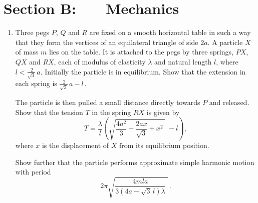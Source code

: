 \documentclass[a4, 11pt]{report}
\newlength{\qspace}
\newcounter{qnumber}
\newenvironment{question}%
 {\vspace{\qspace}
  \begin{enumerate}[\bfseries 1\quad][10]%
    \setcounter{enumi}{\value{qnumber}}%
    \item%
 }
{
  \end{enumerate}
  \filbreak
  \stepcounter{qnumber}
 }
\begin{document}
\newpage
\section*{Section B: \ \ \ Mechanics}
\begin{question}
Three pegs $P$, $Q$ and $R$
 are fixed on a smooth horizontal table in such a way that they
form the vertices of an equilateral triangle of side $2a$. A particle $X$
 of mass $m$ lies on the table.
It is attached to the  pegs by three springs, $PX$, $QX$ and $RX$, each  
of modulus of elasticity
$\lambda$ and
 natural length $l$,
 where $l < \frac{ \ 2 }{\sqrt3}\, a$.
Initially the particle is in equilibrium. 
Show that the extension in each spring is
$\frac{\ 2}{\sqrt3}\,a -l\,$.

The particle is then pulled a small distance directly towards 
$P$ and released. Show that the tension $T$ in the spring 
$RX$ 
is given by
\[
T= \frac {\lambda} l 
\left( \sqrt{\frac {4a^2}3 + \frac{2ax}{\sqrt3} +x^2\; }\; -l\right)
,
\]
 where $x$ is the displacement of $X$ from its equilibrium position. 

Show further that the particle performs approximate 
simple harmonic motion with period
\[
2\pi \sqrt{ \frac{4mla}{3  (4a-\sqrt3 \, l)\lambda } \; }\,.
\]

\end{question}
\end{document}
